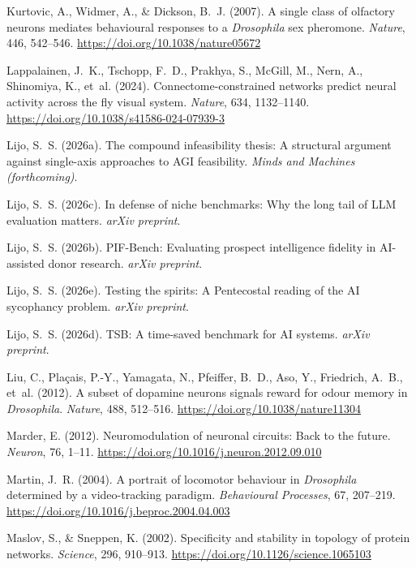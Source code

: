 Kurtovic, A., Widmer, A., \& Dickson, B.~J. (2007). A single class of olfactory neurons mediates behavioural responses to a \emph{Drosophila} sex pheromone. \emph{Nature}, 446, 542--546. \url{https://doi.org/10.1038/nature05672}

Lappalainen, J.~K., Tschopp, F.~D., Prakhya, S., McGill, M., Nern, A., Shinomiya, K., et~al. (2024). Connectome-constrained networks predict neural activity across the fly visual system. \emph{Nature}, 634, 1132--1140. \url{https://doi.org/10.1038/s41586-024-07939-3}

Lijo, S.~S. (2026a). The compound infeasibility thesis: A structural argument against single-axis approaches to AGI feasibility. \emph{Minds and Machines (forthcoming)}.

Lijo, S.~S. (2026c). In defense of niche benchmarks: Why the long tail of LLM evaluation matters. \emph{arXiv preprint}.

Lijo, S.~S. (2026b). PIF-Bench: Evaluating prospect intelligence fidelity in AI-assisted donor research. \emph{arXiv preprint}.

Lijo, S.~S. (2026e). Testing the spirits: A Pentecostal reading of the AI sycophancy problem. \emph{arXiv preprint}.

Lijo, S.~S. (2026d). TSB: A time-saved benchmark for AI systems. \emph{arXiv preprint}.

Liu, C., Pla\c{c}ais, P.-Y., Yamagata, N., Pfeiffer, B.~D., Aso, Y., Friedrich, A.~B., et~al. (2012). A subset of dopamine neurons signals reward for odour memory in \emph{Drosophila}. \emph{Nature}, 488, 512--516. \url{https://doi.org/10.1038/nature11304}

Marder, E. (2012). Neuromodulation of neuronal circuits: Back to the future. \emph{Neuron}, 76, 1--11. \url{https://doi.org/10.1016/j.neuron.2012.09.010}

Martin, J.~R. (2004). A portrait of locomotor behaviour in \emph{Drosophila} determined by a video-tracking paradigm. \emph{Behavioural Processes}, 67, 207--219. \url{https://doi.org/10.1016/j.beproc.2004.04.003}

Maslov, S., \& Sneppen, K. (2002). Specificity and stability in topology of protein networks. \emph{Science}, 296, 910--913. \url{https://doi.org/10.1126/science.1065103}

